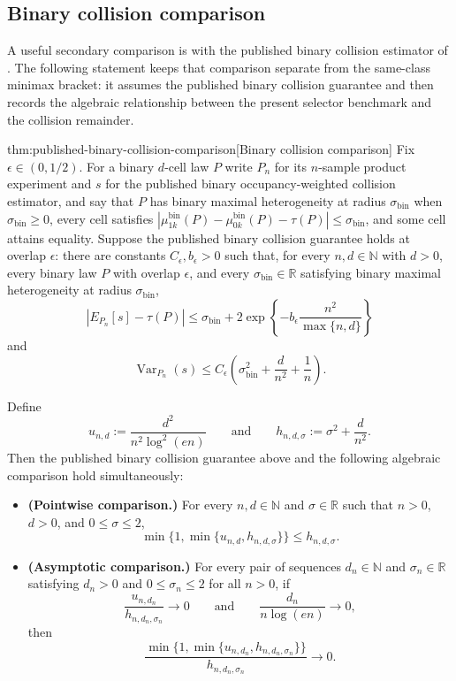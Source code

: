 \documentclass[11pt]{article}
\begin{document}
\subsection{Binary collision comparison}

A useful secondary comparison is with the published binary collision estimator of \citet{ZengBalakrishnanHanKennedy2024}. The following statement keeps that comparison separate from the same-class minimax bracket: it assumes the published binary collision guarantee and then records the algebraic relationship between the present selector benchmark and the collision remainder.

\begin{propositionv}{thm:published-binary-collision-comparison}[Binary collision comparison]
Fix \(\epsilon\in(0,1/2)\).  For a binary \(d\)-cell law \(P\) write \(P_n\) for its \(n\)-sample product experiment and \(s\) for the published binary occupancy-weighted collision estimator, and say that \(P\) has binary maximal heterogeneity at radius \(\sigma_{\mathrm{bin}}\) when \(\sigma_{\mathrm{bin}}\ge0\), every cell satisfies \(\left|\mu_{1k}^{\mathrm{bin}}(P)-\mu_{0k}^{\mathrm{bin}}(P)-\tau(P)\right|\le\sigma_{\mathrm{bin}}\), and some cell attains equality.  Suppose the published binary collision guarantee holds at overlap \(\epsilon\): there are constants \(C_\epsilon,b_\epsilon>0\) such that, for every \(n,d\in\mathbb N\) with \(d>0\), every binary law \(P\) with overlap \(\epsilon\), and every \(\sigma_{\mathrm{bin}}\in\mathbb R\) satisfying binary maximal heterogeneity at radius \(\sigma_{\mathrm{bin}}\),
\[
\left|
E_{P_n}[s]-\tau(P)
\right|
\le
\sigma_{\mathrm{bin}}
+
2\exp\left\{-b_\epsilon\frac{n^2}{\max\{n,d\}}\right\}
\]
and
\[
\operatorname{Var}_{P_n}(s)
\le
C_\epsilon\left(\sigma_{\mathrm{bin}}^2+\frac{d}{n^2}+\frac1n\right).
\]

Define
\[
u_{n,d}:=\frac{d^2}{n^2\log^2(en)}
\qquad\text{and}\qquad
h_{n,d,\sigma}:=\sigma^2+\frac{d}{n^2}.
\]
Then the published binary collision guarantee above and the following algebraic comparison hold simultaneously:
\begin{itemize}
\item \textbf{(Pointwise comparison.)} For every \(n,d\in\mathbb N\) and \(\sigma\in\mathbb R\) such that \(n>0\), \(d>0\), and \(0\le \sigma\le 2\),
\[
\min\{1,\min\{u_{n,d},h_{n,d,\sigma}\}\}\le h_{n,d,\sigma}.
\]
\item \textbf{(Asymptotic comparison.)} For every pair of sequences \(d_n\in\mathbb N\) and \(\sigma_n\in\mathbb R\) satisfying \(d_n>0\) and \(0\le\sigma_n\le2\) for all \(n>0\), if
\[
\frac{u_{n,d_n}}{h_{n,d_n,\sigma_n}}\to0
\qquad\text{and}\qquad
\frac{d_n}{n\log(en)}\to0,
\]
then
\[
\frac{\min\{1,\min\{u_{n,d_n},h_{n,d_n,\sigma_n}\}\}}
{h_{n,d_n,\sigma_n}}
\to0 .
\]
\end{itemize}
\end{propositionv}
\end{document}

